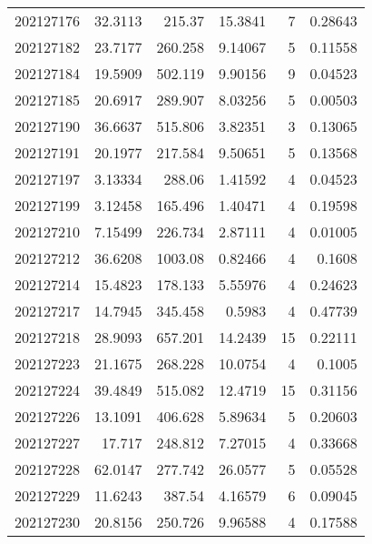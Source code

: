 \begin{tabular}{rrrrrr}
 202127176 &         32.3113  &      215.37   &           15.3841  &           7 & 0.28643 \\
 202127182 &         23.7177  &      260.258  &            9.14067 &           5 & 0.11558 \\
 202127184 &         19.5909  &      502.119  &            9.90156 &           9 & 0.04523 \\
 202127185 &         20.6917  &      289.907  &            8.03256 &           5 & 0.00503 \\
 202127190 &         36.6637  &      515.806  &            3.82351 &           3 & 0.13065 \\
 202127191 &         20.1977  &      217.584  &            9.50651 &           5 & 0.13568 \\
 202127197 &          3.13334 &      288.06   &            1.41592 &           4 & 0.04523 \\
 202127199 &          3.12458 &      165.496  &            1.40471 &           4 & 0.19598 \\
 202127210 &          7.15499 &      226.734  &            2.87111 &           4 & 0.01005 \\
 202127212 &         36.6208  &     1003.08   &            0.82466 &           4 & 0.1608  \\
 202127214 &         15.4823  &      178.133  &            5.55976 &           4 & 0.24623 \\
 202127217 &         14.7945  &      345.458  &            0.5983  &           4 & 0.47739 \\
 202127218 &         28.9093  &      657.201  &           14.2439  &          15 & 0.22111 \\
 202127223 &         21.1675  &      268.228  &           10.0754  &           4 & 0.1005  \\
 202127224 &         39.4849  &      515.082  &           12.4719  &          15 & 0.31156 \\
 202127226 &         13.1091  &      406.628  &            5.89634 &           5 & 0.20603 \\
 202127227 &         17.717   &      248.812  &            7.27015 &           4 & 0.33668 \\
 202127228 &         62.0147  &      277.742  &           26.0577  &           5 & 0.05528 \\
 202127229 &         11.6243  &      387.54   &            4.16579 &           6 & 0.09045 \\
 202127230 &         20.8156  &      250.726  &            9.96588 &           4 & 0.17588 \\

\end{tabular}

